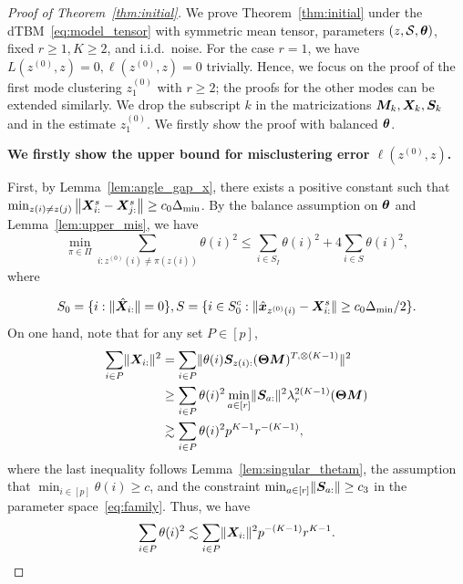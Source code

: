 \documentclass[journal]{IEEEtran}
\theoremstyle{definition}
\theoremstyle{definition}
\begin{document}
\begin{proof}[Proof of Theorem~\ref{thm:initial}] We prove Theorem~\ref{thm:initial} under the dTBM~\eqref{eq:model_tensor} with symmetric mean tensor, parameters $(z, \mathcal{S}, \boldsymbol{\theta})$, {fixed $r\geq 1, K \geq 2$}, and i.i.d.\ noise. {For the case $r = 1$, we have $L(z^{(0)},z) = 0, \ell(z^{(0)}, z) = 0$ trivially. Hence, we focus on the proof of the first mode clustering $z^{(0)}_1$ with $r \geq 2$}; 
the proofs for the other modes can be extended similarly. We drop the subscript $k$ in the matricizations $\bm M_k, \bm X_k, \bm S_k$ and in the estimate $z^{(0)}_1$. We firstly show the proof with balanced $\boldsymbol{\theta}$.

\textbf{We firstly show the upper bound for misclustering error $\ell(z^{(0)}, z)$.}

First, by Lemma~\ref{lem:angle_gap_x}, there exists a positive constant such that $\min_{z(i) \neq z(j)} \left\lVert \bm X^s_{i:} - \bm X^s_{j:} \right\rVert \geq c_0  \Delta_{\min}$. By the balance assumption on $\boldsymbol{\theta}$ and Lemma~\ref{lem:upper_mis}, we have 
 \begin{equation}\label{eq:theta_bound}
          \min_{\pi \in \Pi} \sum_{i : z^{(0)}(i) \neq \pi(z(i))} \theta(i)^2  \leq  \sum_{i \in S_I} \theta(i)^2 + 4 \sum_{i \in S} \theta(i)^2 ,
    \end{equation}
    where 
    
\vspace{-0.5cm}
    \small
    \begin{equation}
        S_0 = \{i: \lVert\hat {\bm X}_{i:}\rVert = 0\}, S = \{i \in S_0^c: \lVert\hat {\bm x}_{z^{(0)}(i)} - \bm X_{i:}^s \rVert \geq c_0  \Delta_{\min}/2\}.
    \end{equation}
    \normalsize
    On one hand, note that for any set $P \in [p]$,
    \begin{align}
        \sum_{i \in P} \lVert\bm X_{i:}\rVert^2 &= \sum_{i \in P} \lVert \theta(i) \bm S_{z(i):} (\boldsymbol{\Theta} \bm M)^{T, \otimes (K-1)} \rVert^2 \\
        & \geq \sum_{i \in P} \theta(i)^2 \min_{a \in [r]} \lVert\bm S_{a:}\rVert^2 \lambda_{r}^{2(K-1)} (\boldsymbol{\Theta} \bm M)\\
        & \gtrsim \sum_{i \in P} \theta(i)^2 p^{K-1} r^{-(K-1)}, 
    \end{align}
    where the last inequality follows Lemma~\ref{lem:singular_thetam}, the assumption that $\min_{i \in [p]} \theta(i) \geq c$, and the constraint $\min_{a \in [r]} \lVert\bm S_{a:}\rVert \geq c_3$ in the parameter space~\eqref{eq:family}. Thus, we have 
    \begin{equation}\label{eq:theta_p}
        \sum_{i \in P} \theta(i)^2 \lesssim \sum_{i \in P} \onormSize{}{\mX_{i:}}^2 p^{-(K-1)} r^{K-1}.
    \end{equation}
    

\end{proof}
\end{document}
